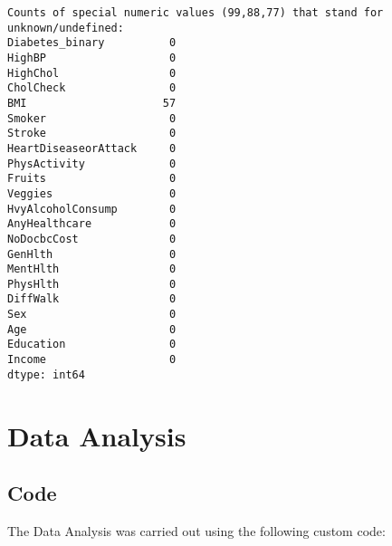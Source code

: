 \documentclass[11pt]{article}
\begin{document}
\begin{Verbatim}[tabsize=4]
Counts of special numeric values (99,88,77) that stand for unknown/undefined:
Diabetes_binary          0
HighBP                   0
HighChol                 0
CholCheck                0
BMI                     57
Smoker                   0
Stroke                   0
HeartDiseaseorAttack     0
PhysActivity             0
Fruits                   0
Veggies                  0
HvyAlcoholConsump        0
AnyHealthcare            0
NoDocbcCost              0
GenHlth                  0
MentHlth                 0
PhysHlth                 0
DiffWalk                 0
Sex                      0
Age                      0
Education                0
Income                   0
dtype: int64

\end{Verbatim}

\section{Data Analysis} \subsection{Code}The Data Analysis was carried out using the following custom code:
\end{document}
